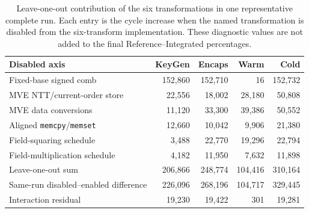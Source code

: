 \begin{table}[t]
\centering
\caption{Leave-one-out contribution of the six transformations in one representative complete run. Each entry is the cycle increase when the named transformation is disabled from the six-transform implementation. These diagnostic values are not added to the final Reference--Integrated percentages.}
\label{tab:leave-one-out}
\footnotesize
\setlength{\tabcolsep}{3.4pt}
\begin{tabular}{@{}lrrrr@{}}
\toprule
Disabled axis & KeyGen & Encaps & Warm & Cold \\
\midrule
Fixed-base signed comb & 152,860 & 152,710 & 16 & 152,732 \\
MVE NTT/current-order store & 22,556 & 18,002 & 28,180 & 50,808 \\
MVE data conversions & 11,120 & 33,300 & 39,386 & 50,552 \\
Aligned \texttt{memcpy}/\texttt{memset} & 12,660 & 10,042 & 9,906 & 21,380 \\
Field-squaring schedule & 3,488 & 22,770 & 19,296 & 22,794 \\
Field-multiplication schedule & 4,182 & 11,950 & 7,632 & 11,898 \\
\midrule
Leave-one-out sum & 206,866 & 248,774 & 104,416 & 310,164 \\
Same-run disabled--enabled difference & 226,096 & 268,196 & 104,717 & 329,445 \\
Interaction residual & 19,230 & 19,422 & 301 & 19,281 \\
\bottomrule
\end{tabular}
\end{table}
